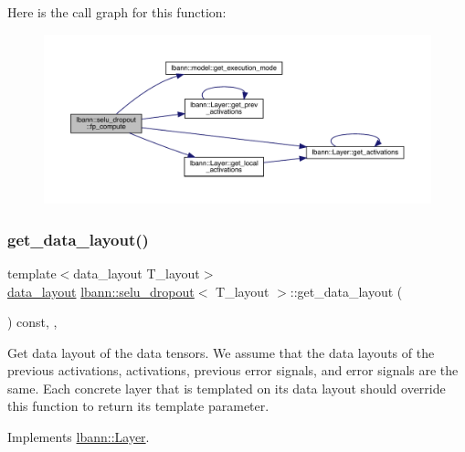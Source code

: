 Here is the call graph for this function\+:\nopagebreak
\begin{figure}[H]
\begin{center}
\leavevmode
\includegraphics[width=350pt]{classlbann_1_1selu__dropout_a50ccce3672873a12ae69cc76c91e767a_cgraph}
\end{center}
\end{figure}
\mbox{\label{classlbann_1_1selu__dropout_ae33633add903276c87f725facf0dcd0c}} 
\subsubsection{\texorpdfstring{get\+\_\+data\+\_\+layout()}{get\_data\_layout()}}
{\footnotesize\ttfamily template$<$data\+\_\+layout T\+\_\+layout$>$ \\
\hyperlink{base_8hpp_a786677cbfb3f5677b4d84f3056eb08db}{data\+\_\+layout} \hyperlink{classlbann_1_1selu__dropout}{lbann\+::selu\+\_\+dropout}$<$ T\+\_\+layout $>$\+::get\+\_\+data\+\_\+layout (\begin{DoxyParamCaption}{ }\end{DoxyParamCaption}) const\hspace{0.3cm}{\ttfamily [inline]}, {\ttfamily [override]}, {\ttfamily [virtual]}}

Get data layout of the data tensors. We assume that the data layouts of the previous activations, activations, previous error signals, and error signals are the same. Each concrete layer that is templated on its data layout should override this function to return its template parameter. 

Implements \hyperlink{classlbann_1_1Layer_a5dfb66e81fc085997402a5e2241316bd}{lbann\+::\+Layer}.



